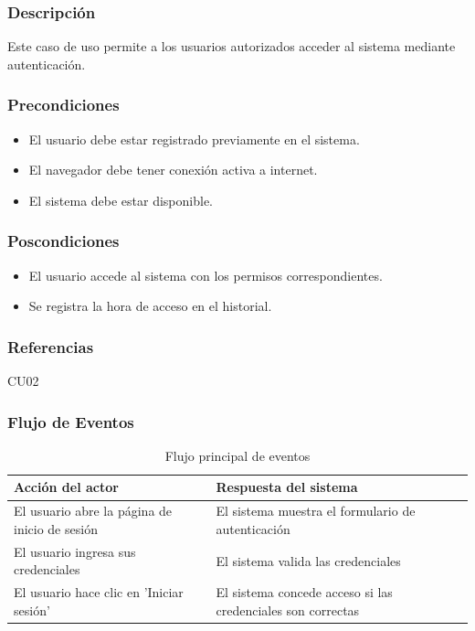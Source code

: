 \subsubsection*{Descripción}
Este caso de uso permite a los usuarios autorizados acceder al sistema mediante autenticación.

\subsubsection*{Precondiciones}
\begin{itemize}
	\item El usuario debe estar registrado previamente en el sistema.
	\item El navegador debe tener conexión activa a internet.
	\item El sistema debe estar disponible.
\end{itemize}

\subsubsection*{Poscondiciones}
\begin{itemize}
	\item El usuario accede al sistema con los permisos correspondientes.
	\item Se registra la hora de acceso en el historial.
\end{itemize}

\subsubsection*{Referencias}
CU02

\clearpage

\subsubsection*{Flujo de Eventos}
\begin{table}[h]
	\centering
	\caption{Flujo principal de eventos}
	\begin{tabular}{|p{7cm}|p{7cm}|}
		\hline
		\textbf{Acción del actor}                     & \textbf{Respuesta del sistema}                              \\ \hline
		El usuario abre la página de inicio de sesión & El sistema muestra el formulario de autenticación           \\ \hline
		El usuario ingresa sus credenciales           & El sistema valida las credenciales                          \\ \hline
		El usuario hace clic en 'Iniciar sesión'      & El sistema concede acceso si las credenciales son correctas \\ \hline
	\end{tabular}
\end{table}

